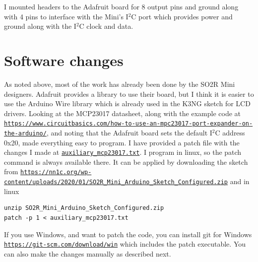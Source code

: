 \documentclass[12pt]{article}
\begin{document}
I mounted headers to the Adafruit board for 8 output pins and ground along
with 4 pins to interface with the Mini's I$^2$C port which provides
power and ground along with the I$^2$C clock and data.

\section{Software changes}
As noted above, most of the work has already been done by the SO2R Mini
designers. Adafruit provides a library to use their board, but I think
it is easier to use the Arduino Wire library which is already used in
the K3NG sketch for LCD drivers. Looking at the MCP23017 datasheet,
along with the example code at 
\href{https://www.circuitbasics.com/how-to-use-an-mpc23017-port-expander-on-the-arduino/}
{\nolinkurl{https://www.circuitbasics.com/how-to-use-an-mpc23017-port-expander-on-the-arduino/}},
and noting that the Adafruit board sets the default I$^2$C address
0x20, made everything easy to program. I have provided a patch file with
the changes I made at
\href{https://w9cf.github.io/articles/so2rmini/auxiliary_mcp23017.txt}
{\nolinkurl{auxiliary_mcp23017.txt}}.
I program in linux, so the patch command is always
available there. It can be applied by downloading the sketch from
\href{https://nn1c.org/wp-content/uploads/2020/01/SO2R_Mini_Arduino_Sketch_Configured.zip}
{\nolinkurl{https://nn1c.org/wp-content/uploads/2020/01/SO2R_Mini_Arduino_Sketch_Configured.zip}}
and in linux
\begin{verbatim}
unzip SO2R_Mini_Arduino_Sketch_Configured.zip
patch -p 1 < auxiliary_mcp23017.txt
\end{verbatim}

If you use Windows, and want to patch the code, you can install
git for Windows
\href{https://git-scm.com/download/win}
{\nolinkurl{https://git-scm.com/download/win}}
which includes the
patch executable. You can also make the changes manually as described next.
\end{document}
